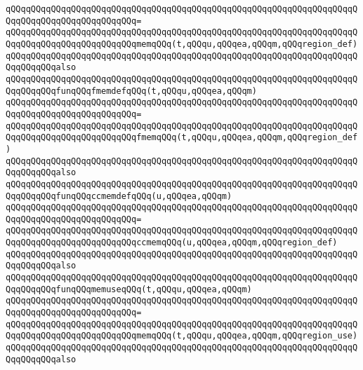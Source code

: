 \verb|qQQqqQQqqQQqqQQqqQQqqQQqqQQqqQQqqQQqqQQqqQQqqQQqqQQqqQQqqQQqqQQqqQQqqQQqqQQqqQQqqQQqqQQqqQQqqQQq=|\newline
\verb|qQQqqQQqqQQqqQQqqQQqqQQqqQQqqQQqqQQqqQQqqQQqqQQqqQQqqQQqqQQqqQQqqQQqqQQqqQQqqQQqqQQqqQQqqQQqqQQqmemqQQq(t,qQQqu,qQQqea,qQQqm,qQQqregion_def)|\newline
\newline
\verb|qQQqqQQqqQQqqQQqqQQqqQQqqQQqqQQqqQQqqQQqqQQqqQQqqQQqqQQqqQQqqQQqqQQqqQQqqQQqqQQqalso|\newline
\verb|qQQqqQQqqQQqqQQqqQQqqQQqqQQqqQQqqQQqqQQqqQQqqQQqqQQqqQQqqQQqqQQqqQQqqQQqqQQqqQQqfunqQQqfmemdefqQQq(t,qQQqu,qQQqea,qQQqm)|\newline
\verb|qQQqqQQqqQQqqQQqqQQqqQQqqQQqqQQqqQQqqQQqqQQqqQQqqQQqqQQqqQQqqQQqqQQqqQQqqQQqqQQqqQQqqQQqqQQqqQQq=|\newline
\verb|qQQqqQQqqQQqqQQqqQQqqQQqqQQqqQQqqQQqqQQqqQQqqQQqqQQqqQQqqQQqqQQqqQQqqQQqqQQqqQQqqQQqqQQqqQQqqQQqfmemqQQq(t,qQQqu,qQQqea,qQQqm,qQQqregion_def)|\newline
\newline
\verb|qQQqqQQqqQQqqQQqqQQqqQQqqQQqqQQqqQQqqQQqqQQqqQQqqQQqqQQqqQQqqQQqqQQqqQQqqQQqqQQqalso|\newline
\verb|qQQqqQQqqQQqqQQqqQQqqQQqqQQqqQQqqQQqqQQqqQQqqQQqqQQqqQQqqQQqqQQqqQQqqQQqqQQqqQQqfunqQQqccmemdefqQQq(u,qQQqea,qQQqm)|\newline
\verb|qQQqqQQqqQQqqQQqqQQqqQQqqQQqqQQqqQQqqQQqqQQqqQQqqQQqqQQqqQQqqQQqqQQqqQQqqQQqqQQqqQQqqQQqqQQqqQQq=|\newline
\verb|qQQqqQQqqQQqqQQqqQQqqQQqqQQqqQQqqQQqqQQqqQQqqQQqqQQqqQQqqQQqqQQqqQQqqQQqqQQqqQQqqQQqqQQqqQQqqQQqccmemqQQq(u,qQQqea,qQQqm,qQQqregion_def)|\newline
\newline
\verb|qQQqqQQqqQQqqQQqqQQqqQQqqQQqqQQqqQQqqQQqqQQqqQQqqQQqqQQqqQQqqQQqqQQqqQQqqQQqqQQqalso|\newline
\verb|qQQqqQQqqQQqqQQqqQQqqQQqqQQqqQQqqQQqqQQqqQQqqQQqqQQqqQQqqQQqqQQqqQQqqQQqqQQqqQQqfunqQQqmemuseqQQq(t,qQQqu,qQQqea,qQQqm)|\newline
\verb|qQQqqQQqqQQqqQQqqQQqqQQqqQQqqQQqqQQqqQQqqQQqqQQqqQQqqQQqqQQqqQQqqQQqqQQqqQQqqQQqqQQqqQQqqQQqqQQq=|\newline
\verb|qQQqqQQqqQQqqQQqqQQqqQQqqQQqqQQqqQQqqQQqqQQqqQQqqQQqqQQqqQQqqQQqqQQqqQQqqQQqqQQqqQQqqQQqqQQqqQQqmemqQQq(t,qQQqu,qQQqea,qQQqm,qQQqregion_use)|\newline
\newline
\verb|qQQqqQQqqQQqqQQqqQQqqQQqqQQqqQQqqQQqqQQqqQQqqQQqqQQqqQQqqQQqqQQqqQQqqQQqqQQqqQQqalso|\newline
